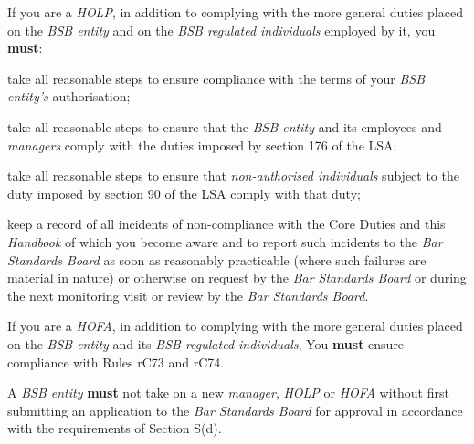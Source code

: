


If you are a \emph{HOLP}, in addition to complying with the more general
duties placed on the \emph{BSB entity} and on the \emph{BSB regulated
individuals} employed by it, you \textcolor{myred}{\textbf{must}}:
\begin{numlist}
\item take all reasonable steps to ensure compliance with the terms of your
\emph{BSB entity's} authorisation;

\item take all reasonable steps to ensure that the \emph{BSB entity} and
its employees and \emph{managers} comply with the duties imposed by
section 176 of the LSA;

\item take all reasonable steps to ensure that \emph{non-authorised
individuals} subject to the duty imposed by section 90 of the LSA comply
with that duty;

\item keep a record of all incidents of non-compliance with the Core Duties
and this \emph{Handbook} of which you become aware and to report such
incidents to the \emph{Bar Standards Board} as soon as reasonably
practicable (where such failures are material in nature) or otherwise on
request by the \emph{Bar Standards Board} or during the next monitoring
visit or review by the \emph{Bar Standards Board}.
\end{numlist}

If you are a \emph{HOFA}, in addition to complying with the more general
duties placed on the \emph{BSB entity} and its \emph{BSB regulated
individuals}, You \textcolor{myred}{\textbf{must}} ensure compliance with Rules rC73 and rC74.




A \emph{BSB entity} \textcolor{myred}{\textbf{must}} not take on a new \emph{manager}, \emph{HOLP}
or \emph{HOFA} without first submitting an application to the \emph{Bar
Standards Board} for approval in accordance with the requirements of
Section S(d).



